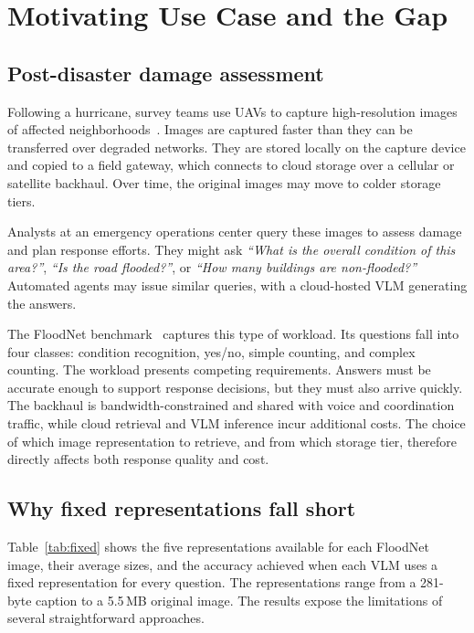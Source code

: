 \documentclass[10pt,conference]{IEEEtran}
\begin{document}
\section{Motivating Use Case and the Gap}
\label{sec:usecase}

\subsection{Post-disaster damage assessment}

Following a hurricane, survey teams use UAVs to capture high-resolution images of affected neighborhoods~\cite{rahnemoonfar2021floodnet}. Images are captured faster than they can be transferred over degraded networks. They are stored locally on the capture device and copied to a field gateway, which connects to cloud storage over a cellular or satellite backhaul. Over time, the original images may move to colder storage tiers.

Analysts at an emergency operations center query these images to assess damage and plan response efforts. They might ask \emph{``What is the overall condition of this area?''}, \emph{``Is the road flooded?''}, or \emph{``How many buildings are non-flooded?''} Automated agents may issue similar queries, with a cloud-hosted VLM generating the answers.

The FloodNet benchmark~\cite{rahnemoonfar2021floodnet} captures this type of workload. Its questions fall into four classes: condition recognition, yes/no, simple counting, and complex counting. The workload presents competing requirements. Answers must be accurate enough to support response decisions, but they must also arrive quickly. The backhaul is bandwidth-constrained and shared with voice and coordination traffic, while cloud retrieval and VLM inference incur additional costs. The choice of which image representation to retrieve, and from which storage tier, therefore directly affects both response quality and cost.



\subsection{Why fixed representations fall short}

Table~\ref{tab:fixed} shows the five representations available for each FloodNet image, their average sizes, and the accuracy achieved when each VLM uses a fixed representation for every question. The representations range from a 281-byte caption to a 5.5\,MB original image. The results expose the limitations of several straightforward approaches.
\end{document}
